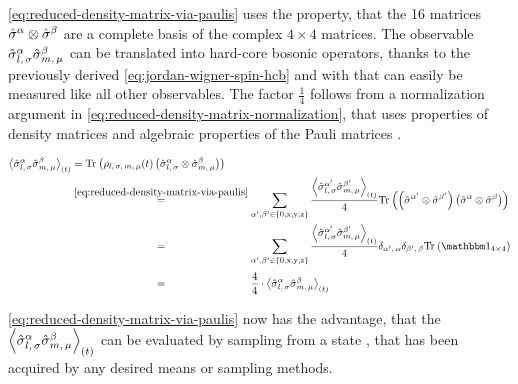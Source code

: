 \autoref{eq:reduced-density-matrix-via-paulis} uses the property, that the 16 matrices $\pauli{$\alpha$}\otimes\pauli{$\beta$}$ are a complete basis of the complex $4\times 4$ matrices.
The observable $\pauli[l,\,\sigma]{$\alpha$}\pauli[m,\,\mu]{$\beta$}$ can be translated into hard-core bosonic operators, thanks to the previously derived \autoref{eq:jordan-wigner-spin-hcb} and with that can easily be measured like all other observables.
The factor $\frac{1}{4}$ follows from a normalization argument in \autoref{eq:reduced-density-matrix-normalization}, that uses properties of density matrices \cite{partialTraceEntanglementOfSubsystemsBlochVector} and algebraic properties of the Pauli matrices \cite{pauliPropertiesAndBlochVector}.

\begin{equation}
    \label{eq:reduced-density-matrix-normalization}
    \begin{split}
        \timeExpectationVal{ \pauli[l,\,\sigma]{$\alpha$}\pauli[m,\,\mu]{$\beta$} } &= \partialTrace{}{\rho_{l,\,\sigma,\,m,\,\mu} (t) \left(\pauli[l,\,\sigma]{$\alpha$}\otimes\pauli[m,\,\mu]{$\beta$}\right)}  \\
        &\stackrel{\ref{eq:reduced-density-matrix-via-paulis}}{=}\sum\limits_{\alpha',\beta'\in\left\{0,\text{x},\text{y},\text{z}\right\}} \frac{{\timeExpectationVal{ \pauli[l,\,\sigma]{$\alpha'$}\pauli[m,\,\mu]{$\beta'$} }}}{4}
        \partialTrace{}{\left(\pauli{$\alpha'$}\otimes\pauli{$\beta'$}\right)\left(\pauli{$\alpha$}\otimes\pauli{$\beta$}\right)}\\
        &\stackrel{\phantom{\ref{eq:reduced-density-matrix-via-paulis}}}{=}\sum\limits_{\alpha',\beta'\in\left\{0,\text{x},\text{y},\text{z}\right\}} \frac{\timeExpectationVal{ \pauli[l,\,\sigma]{$\alpha'$}\pauli[m,\,\mu]{$\beta'$} }}{4}
        \delta_{\alpha',\,\alpha}\delta_{\beta',\,\beta}\partialTrace{}{\one[4\times 4]}\\
        &\stackrel{\phantom{\ref{eq:reduced-density-matrix-via-paulis}}}{=}\frac{4}{4} \cdot \timeExpectationVal{ \pauli[l,\,\sigma]{$\alpha$}\pauli[m,\,\mu]{$\beta$} }
    \end{split}
\end{equation}

\autoref{eq:reduced-density-matrix-via-paulis} now has the advantage, that the $\timeExpectationVal{ \pauli[l,\,\sigma]{$\alpha$}\pauli[m,\,\mu]{$\beta$} }$ can be evaluated by sampling from a state \psiOfT, that has been acquired by any desired means or sampling methods.

